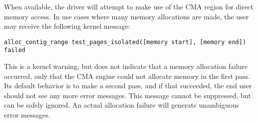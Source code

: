 \iffalse
This file is protected by Copyright. Please refer to the COPYRIGHT file
distributed with this source distribution.

This file is part of OpenCPI <http://www.opencpi.org>

OpenCPI is free software: you can redistribute it and/or modify it under the
terms of the GNU Lesser General Public License as published by the Free Software
Foundation, either version 3 of the License, or (at your option) any later
version.

OpenCPI is distributed in the hope that it will be useful, but WITHOUT ANY
WARRANTY; without even the implied warranty of MERCHANTABILITY or FITNESS FOR A
PARTICULAR PURPOSE. See the GNU Lesser General Public License for more details.

You should have received a copy of the GNU Lesser General Public License along
with this program. If not, see <http://www.gnu.org/licenses/>.
\fi

\newlength{\savedparindentdrvr}%
\setlength{\savedparindentdrvr}{\parindent}%
\setlength{\parindent}{0pt} %
\providecommand{\forceindent}{\leavevmode{\parindent=1em\indent}}%

When available, the driver will attempt to make use of the CMA region for direct memory access. In use cases where many memory allocations are made, the user may receive the following kernel message:

\begin{lstlisting}
alloc_contig_range test_pages_isolated([memory start], [memory end]) failed
\end{lstlisting}

This is a kernel warning, but does not indicate that a memory allocation failure occurred, only that the CMA engine could not allocate memory in the first pass. Its default behavior is to make a second pass, and if that succeeded, the end user should not see any more error messages. This message cannot be suppressed, but can be safely ignored. An actual allocation failure will generate unambiguous error messages.

\setlength{\parindent}{\savedparindentdrvr}%
